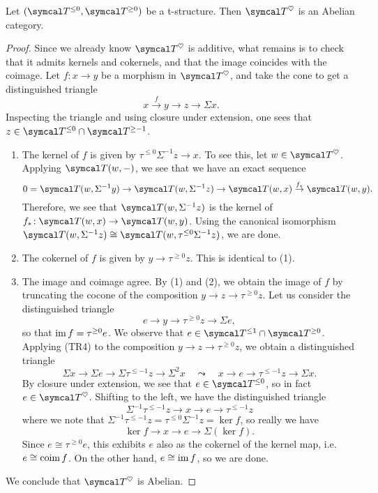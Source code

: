 \begin{theorem}\label{thm:t-structure-heart-is-abelian}
	Let \((\calT^{\leq 0},\calT^{\geq0})\) be a t-structure. Then \(\calT^\heartsuit\) is an Abelian category.
\end{theorem}
\begin{proof}
Since we already know \(\calT^\heartsuit\) is additive, what remains is to check that it admits kernels and cokernels, and that the image coincides with the coimage.
Let \(f\!:x\to y\) be a morphism in \(\calT^\heartsuit\), and take the cone to get a distinguished triangle
\[ x\overset{f}\to y \to z \to \Sigma x. \]
Inspecting the triangle and using closure under extension, one sees that \(z\in\calT^{\leq 0}\cap\calT^{\geq -1}\).
\begin{enumerate}[label=(\arabic*)]
	\item The kernel of \(f\) is given by \(\tau^{\leq0}\Sigma^{-1} z \to x\). To see this, let \(w\in\calT^\heartsuit\). Applying \(\calT(w,-)\), we see that we have an exact sequence
	\[  0 = \calT(w,\Sigma^{-1}y) \to \calT(w,\Sigma^{-1}z) \to \calT(w,x)\overset{f_*}\to\calT(w,y). \]
	Therefore, we see that \(\calT(w,\Sigma^{-1}z)\) is the kernel of \(f_*\!:\calT(w,x)\to\calT(w,y)\). Using the canonical isomorphism \(\calT(w,\Sigma^{-1}z) \cong \calT(w,\tau^{\leq 0}\Sigma^{-1}z)\),
	we are done.
	\item The cokernel of \(f\) is given by \(y\to \tau^{\geq 0}z\). This is identical to (1).
	\item The image and coimage agree. By (1) and (2), we obtain the image of \(f\) by truncating the cocone of the composition \(y\to z \to \tau^{\geq 0}z\). Let us consider the distinguished triangle
	\[ e \to y \to \tau^{\geq 0}z \to \Sigma e, \]
	so that \(\operatorname{im}{f} = \tau^{\geq 0}e\). We observe that \(e\in\calT^{\leq1}\cap\calT^{\geq0}\). Applying (TR4) to the composition \(y \to z \to \tau^{\geq 0}z\), we obtain a distinguished triangle
	\[ \Sigma x \to \Sigma e \to \Sigma\tau^{\leq-1}z \to \Sigma^2 x \quad\leadsto\quad x \to e \to \tau^{\leq-1}z \to \Sigma x.\]
	By closure under extension, we see that \(e\in\calT^{\leq 0}\), so in fact \(e\in\calT^\heartsuit\). Shifting to the left, we have the distinguished triangle
	\[ \Sigma^{-1}\tau^{\leq-1}z \to x \to e \to \tau^{\leq-1}z \]
	where we note that \(\Sigma^{-1}\tau^{\leq-1}z = \tau^{\leq 0}\Sigma^{-1} z = \ker{f}\), so really we have
	\[ \ker{f} \to x \to e \to \Sigma(\ker{f}). \]
	Since \(e \cong \tau^{\geq 0}e\), this exhibits \(e\) also as the cokernel of the kernel map, i.e.\ \(e \cong \operatorname{coim}{f} \). On the other hand,
	\(e\cong\operatorname{im}{f}\), so we are done.
\end{enumerate}
We conclude that \(\calT^\heartsuit\) is Abelian.
\end{proof}

